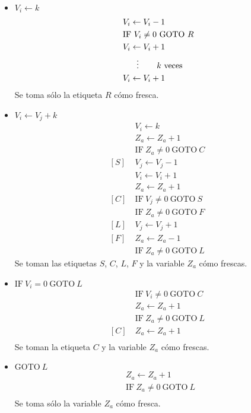 \documentclass[fleqn, 11pt]{article}
\newcommand{\into}{\leftarrow}
\newcommand{\IF}{\text{IF}}
\newcommand{\GOTO}{\text{GOTO}}
\begin{document}
\begin{itemize}
	\item $V_i \into k$
		\begin{align*}
			[R]\ & V_i \into V_i - 1 \\
			     & \IF\ V_i \neq 0\ \GOTO\ R \\
			     & V_i \into V_i + 1 \\
			     & \hspace{1.5em} \vdots
			       \hspace{2em}k\ \text{veces} \\
			     & V_i \into V_i + 1
		\end{align*}
		Se toma sólo la etiqueta $R$ cómo fresca.
	\item $V_i \into V_j + k$
		\begin{align*}
			     & V_i \into k \\
			     & Z_a \into Z_a + 1 \\
			     & \IF\ Z_a \neq 0\ \GOTO\ C \\
			[S]\ & V_j \into V_j - 1 \\
			     & V_i \into V_i + 1 \\
			     & Z_a \into Z_a + 1 \\
			[C]\ & \IF\ V_j \neq 0\ \GOTO\ S \\
			     & \IF\ Z_a \neq 0\ \GOTO\ F \\
			[L]\ & V_j \into V_j + 1 \\
			[F]\ & Z_a \into Z_a - 1 \\
			     & \IF\ Z_a \neq 0\ \GOTO\ L
		\end{align*}
		Se toman las etiquetas $S$, $C$, $L$, $F$ y la variable
		$Z_a$ cómo frescas.
	\item $\IF\ V_i = 0\ \GOTO\ L$
		\begin{align*}
			     &\IF\ V_i \neq 0\ \GOTO\ C \\
			     &Z_a \into Z_a + 1 \\
			     &\IF\ Z_a \neq 0\ \GOTO\ L \\
			[C]\ &Z_a \into Z_a + 1 \\
		\end{align*}
		Se toman la etiqueta $C$ y la variable $Z_a$ cómo frescas.
	\item $\GOTO\ L$
		\begin{align*}
			     &Z_a \into Z_a + 1 \\
			     &\IF\ Z_a \neq 0\ \GOTO\ L \\
		\end{align*}
		Se toma sólo la variable $Z_a$ cómo fresca.
\end{itemize}
\end{document}
